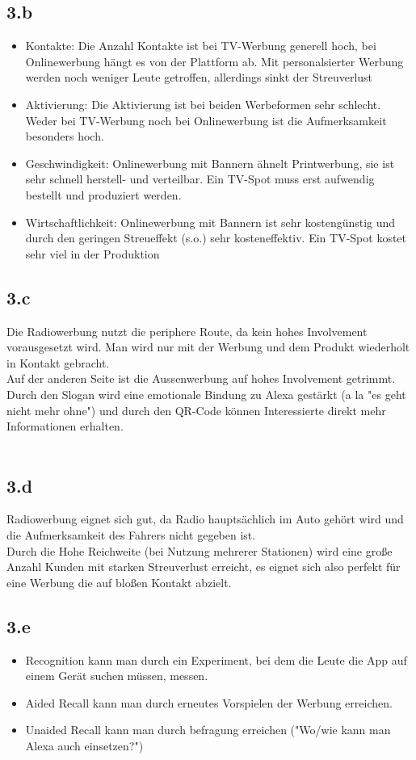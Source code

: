 \subsection{3.b}
    \begin{itemize}
        \item Kontakte: Die Anzahl Kontakte ist bei TV-Werbung generell hoch, bei Onlinewerbung hängt es von der Plattform ab. Mit personalsierter Werbung werden noch weniger Leute getroffen, allerdings sinkt der Streuverlust
        \item Aktivierung: Die Aktivierung ist bei beiden Werbeformen sehr schlecht. Weder bei TV-Werbung noch bei Onlinewerbung ist die Aufmerksamkeit besonders hoch.
        \item Geschwindigkeit: Onlinewerbung mit Bannern ähnelt Printwerbung, sie ist sehr schnell herstell- und verteilbar. Ein TV-Spot muss erst aufwendig bestellt und produziert werden.
        \item Wirtschaftlichkeit: Onlinewerbung mit Bannern ist sehr kostengünstig und durch den geringen Streueffekt (s.o.) sehr kosteneffektiv. Ein TV-Spot kostet sehr viel in der Produktion
    \end{itemize}
    
\subsection{3.c}
    Die Radiowerbung nutzt die periphere Route, da kein hohes Involvement vorausgesetzt wird. 
    Man wird nur mit der Werbung und dem Produkt wiederholt in Kontakt gebracht. \\
    Auf der anderen Seite ist die Aussenwerbung auf hohes Involvement getrimmt.
    Durch den Slogan wird eine emotionale Bindung zu Alexa gestärkt (a la "es geht nicht mehr ohne")
    und durch den QR-Code können Interessierte direkt mehr Informationen erhalten. \\
    \ \\

\subsection{3.d}
    Radiowerbung eignet sich gut, da Radio hauptsächlich im Auto gehört wird und die Aufmerksamkeit des Fahrers nicht gegeben ist. \\
    Durch die Hohe Reichweite (bei Nutzung mehrerer Stationen) wird eine große Anzahl Kunden mit starken Streuverlust erreicht,
    es eignet sich also perfekt für eine Werbung die auf bloßen Kontakt abzielt.

\subsection{3.e}
    \begin{itemize}
        \item Recognition kann man durch ein Experiment, bei dem die Leute die App auf einem Gerät suchen müssen, messen.
        \item Aided Recall kann man durch erneutes Vorspielen der Werbung erreichen.
        \item Unaided Recall kann man durch befragung erreichen ("Wo/wie kann man Alexa auch einsetzen?")
    \end{itemize}